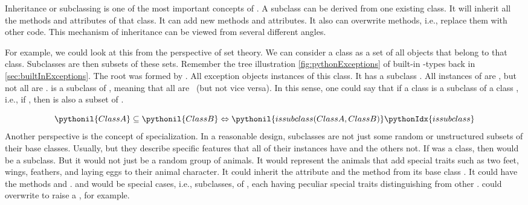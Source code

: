 %
\label{sec:inheritance}%
%
Inheritance or subclassing is one of the most important concepts of .
A subclass can be derived from one existing class.
It will inherit all the methods and attributes of that class.
It can add new methods and attributes.
It also can overwrite methods, i.e., replace them with other code.
This mechanism of inheritance can be viewed from several different angles.%
%
\begin{sloppypar}%
For example, we could look at this from the perspective of set theory.
We can consider a class as a set of all objects that belong to that class.
Subclasses are then subsets of these sets.
Remember the tree illustration \cref{fig:pythonExceptions} of built-in -types back in \cref{sec:builtInExceptions}.
The root was formed by .
All exception objects instances of this class.
It has a subclass .
All instances of  are , but not all  are .
 is a subclass of , meaning that all  are ~(but not vice versa).
In this sense, one could say that if a class  is a subclass of a class , i.e., if , then  is also a subset of .%
\end{sloppypar}%
%
\begin{equation}%
\pythonil{ClassA} \subseteq \pythonil{ClassB} \Leftrightarrow \pythonil{issubclass(ClassA, ClassB)}\pythonIdx{issubclass}%
\end{equation}%
%
Another perspective is the concept of specialization.
In a reasonable design, subclasses are not just some random or unstructured subsets of their base classes.
Usually, but they describe specific features that all of their instances have and the others not.
If  was a class, then  would be a subclass.
But it would not just be a random group of animals.
It would represent the animals that add special traits such as two feet, wings, feathers, and laying eggs to their animal character.
It could inherit the attribute  and the method  from its base class .
It could have the methods  and .
 and  would be special cases, i.e., subclasses, of , each having peculiar special traits distinguishing from other .
 could overwrite  to raise a , for example.

